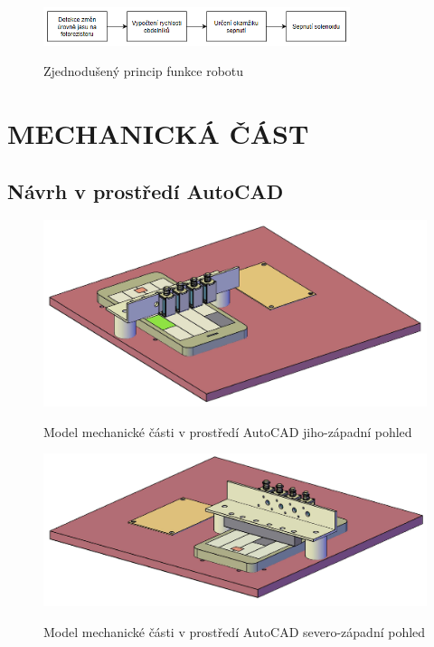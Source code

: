 \documentclass[12pt,oneside]{book} %
\begin{document}
\begin{figure}[ht] \large\centering
\includegraphics[width=0.80\textwidth]{./img/blok_0.png}\\[1cm] 
\caption{Zjednodušený princip funkce robotu}
\label{blok_0}
\end{figure}   
\part{MECHANICKÁ ČÁST}\label{mechanika}
\chapter{Návrh v prostředí AutoCAD}\label{CAD}

\begin{figure}[ht]\large\centering
\includegraphics[width=1.00\textwidth]{./img/mech_cad0.png}\\[1cm] 
\caption{Model mechanické části v prostředí AutoCAD jiho-západní pohled}
\label{mech_cad0}
\end{figure}  

\begin{figure}[ht]\large\centering
\includegraphics[width=1.00\textwidth]{./img/mech_cad1.png}\\[1cm] 
\caption{Model mechanické části v prostředí AutoCAD severo-západní pohled}
\label{mech_cad1}
\end{figure}  
\end{document}
